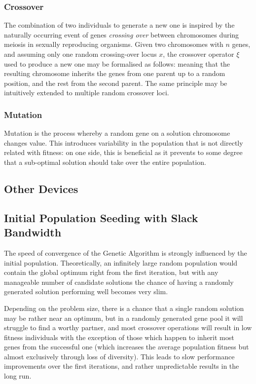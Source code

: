 \subsubsection{Crossover}
The combination of two individuals to generate a new one is inspired by the naturally occurring event of genes \emph{crossing over} between chromosomes during meiosis in sexually reproducing organisms.
Given two chromosomes with $n$ genes, and assuming only one random crossing-over locus $x$, the crossover operator $\xi$ used to produce a new one may be formalised as follows:
meaning that the resulting chromosome inherits the genes from one parent up to a random position, and the rest from the second parent. The same principle may be intuitively extended to multiple random crossover loci.

\subsubsection{Mutation}
Mutation is the process whereby a random gene on a solution chromosome changes value.
This introduces variability in the population that is not directly related with fitness: on one side, this is beneficial as it prevents to some degree that a sub-optimal solution should take over the entire population.

\subsection{Other Devices}

\subsection{Initial Population Seeding with Slack Bandwidth}
The speed of convergence of the Genetic Algorithm is strongly influenced by the initial population.
Theoretically, an infinitely large random population would contain the global optimum right from the first iteration, but with any manageable number of candidate solutions the chance of having a randomly generated solution performing well becomes very slim.

Depending on the problem size, there is a chance that a single random solution may be rather near an optimum, but in a randomly generated gene pool it will struggle to find a worthy partner, and most crossover operations will result in low fitness individuals with the exception of those which happen to inherit most genes from the successful one (which increases the average population fitness but almost exclusively through loss of diversity). This leads to slow performance improvements over the first iterations, and rather unpredictable results in the long run.

